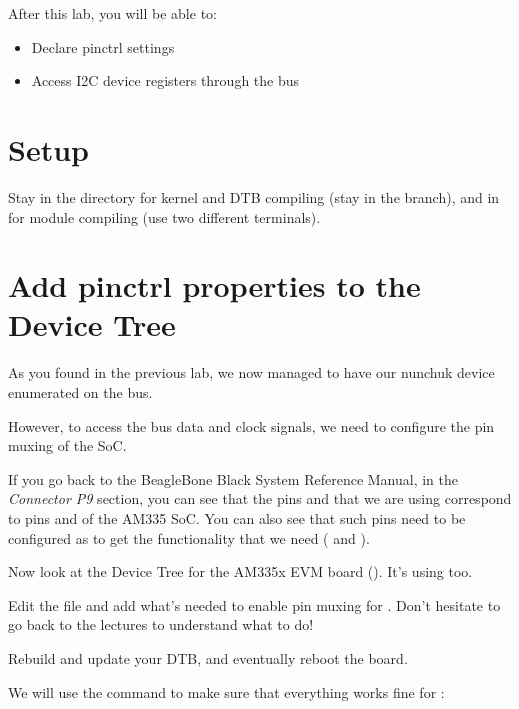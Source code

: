 
After this lab, you will be able to:

\begin{itemize}
\item Declare pinctrl settings
\item Access I2C device registers through the bus
\end{itemize}

\section{Setup}

Stay in the  directory for kernel and DTB
compiling (stay in the  branch), and in
 for module compiling
(use two different terminals).

\section{Add pinctrl properties to the Device Tree}

As you found in the previous lab, we now managed to have our nunchuk
device enumerated on the  bus.

However, to access the bus data and clock signals, we need to configure
the pin muxing of the SoC.

If you go back to the BeagleBone Black System Reference Manual, in the
{\em Connector P9} section, you can see that the pins  and
 that we are using correspond to pins  and 
of the AM335 SoC. You can also see that such pins need to be configured 
as  to get the functionality that we need (
and ).

Now look at the Device Tree for the AM335x EVM board
(). It's using  too.

Edit the  file and 
add what's needed to enable pin muxing for .
Don't hesitate to go back to the lectures to understand what to do!

Rebuild and update your DTB, and eventually reboot the board.

We will use the  command to make sure that 
everything works fine for :

